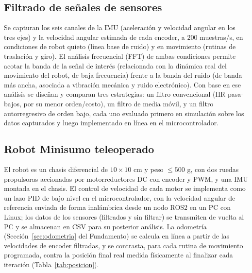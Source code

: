 \subsection{Filtrado de señales de sensores}

Se capturan los seis canales de la IMU (aceleración y velocidad angular en los tres ejes) y la velocidad angular estimada de cada encoder, a $200$ muestras/s, en condiciones de robot quieto (línea base de ruido) y en movimiento (rutinas de traslación y giro). El análisis frecuencial (FFT) de ambas condiciones permite acotar la banda de la señal de interés (relacionada con la dinámica real del movimiento del robot, de baja frecuencia) frente a la banda del ruido (de banda más ancha, asociada a vibración mecánica y ruido electrónico). Con base en ese análisis se diseñan y comparan tres estrategias: un filtro convencional (IIR pasa-bajos, por su menor orden/costo), un filtro de media móvil, y un filtro autorregresivo de orden bajo, cada uno evaluado primero en simulación sobre los datos capturados y luego implementado en línea en el microcontrolador.

\subsection{Robot Minisumo teleoperado}

El robot es un chasis diferencial de $10\times10$ cm y peso $\leq 500$ g, con dos ruedas propulsoras accionadas por motorreductores DC con encoder y PWM, y una IMU montada en el chasis. El control de velocidad de cada motor se implementa como un lazo PID de bajo nivel en el microcontrolador, con la velocidad angular de referencia enviada de forma inalámbrica desde un nodo ROS2 en un PC con Linux; los datos de los sensores (filtrados y sin filtrar) se transmiten de vuelta al PC y se almacenan en CSV para su posterior análisis. La odometría (Sección~\ref{sec:odometria} del Fundamento) se calcula en línea a partir de las velocidades de encoder filtradas, y se contrasta, para cada rutina de movimiento programada, contra la posición final real medida físicamente al finalizar cada iteración (Tabla~\ref{tab:posicion}).
